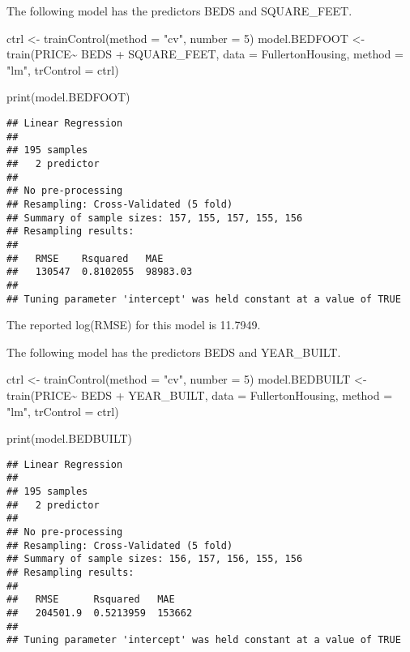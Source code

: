 \documentclass[
]{article}
\newenvironment{Shaded}{\begin{snugshade}}{\end{snugshade}}
\newcommand{\AttributeTok}[1]{\textcolor[rgb]{0.77,0.63,0.00}{#1}}
\newcommand{\DecValTok}[1]{\textcolor[rgb]{0.00,0.00,0.81}{#1}}
\newcommand{\FunctionTok}[1]{\textcolor[rgb]{0.00,0.00,0.00}{#1}}
\newcommand{\NormalTok}[1]{#1}
\newcommand{\OtherTok}[1]{\textcolor[rgb]{0.56,0.35,0.01}{#1}}
\newcommand{\SpecialCharTok}[1]{\textcolor[rgb]{0.00,0.00,0.00}{#1}}
\newcommand{\StringTok}[1]{\textcolor[rgb]{0.31,0.60,0.02}{#1}}
\begin{document}
The following model has the predictors BEDS and SQUARE\_FEET.

\begin{Shaded}
\begin{Highlighting}[]
\NormalTok{ctrl }\OtherTok{\textless{}{-}} \FunctionTok{trainControl}\NormalTok{(}\AttributeTok{method =} \StringTok{"cv"}\NormalTok{, }\AttributeTok{number =} \DecValTok{5}\NormalTok{)}
\NormalTok{model.BEDFOOT }\OtherTok{\textless{}{-}} \FunctionTok{train}\NormalTok{(PRICE}\SpecialCharTok{\textasciitilde{}}\NormalTok{ BEDS }\SpecialCharTok{+}\NormalTok{ SQUARE\_FEET, }
               \AttributeTok{data =}\NormalTok{ FullertonHousing, }\AttributeTok{method =} \StringTok{"lm"}\NormalTok{, }\AttributeTok{trControl =}\NormalTok{ ctrl)}

\FunctionTok{print}\NormalTok{(model.BEDFOOT)}
\end{Highlighting}
\end{Shaded}

\begin{verbatim}
## Linear Regression 
## 
## 195 samples
##   2 predictor
## 
## No pre-processing
## Resampling: Cross-Validated (5 fold) 
## Summary of sample sizes: 157, 155, 157, 155, 156 
## Resampling results:
## 
##   RMSE    Rsquared   MAE     
##   130547  0.8102055  98983.03
## 
## Tuning parameter 'intercept' was held constant at a value of TRUE
\end{verbatim}

The reported log(RMSE) for this model is 11.7949.

The following model has the predictors BEDS and YEAR\_BUILT.

\begin{Shaded}
\begin{Highlighting}[]
\NormalTok{ctrl }\OtherTok{\textless{}{-}} \FunctionTok{trainControl}\NormalTok{(}\AttributeTok{method =} \StringTok{"cv"}\NormalTok{, }\AttributeTok{number =} \DecValTok{5}\NormalTok{)}
\NormalTok{model.BEDBUILT }\OtherTok{\textless{}{-}} \FunctionTok{train}\NormalTok{(PRICE}\SpecialCharTok{\textasciitilde{}}\NormalTok{ BEDS }\SpecialCharTok{+}\NormalTok{ YEAR\_BUILT, }
               \AttributeTok{data =}\NormalTok{ FullertonHousing, }\AttributeTok{method =} \StringTok{"lm"}\NormalTok{, }\AttributeTok{trControl =}\NormalTok{ ctrl)}

\FunctionTok{print}\NormalTok{(model.BEDBUILT)}
\end{Highlighting}
\end{Shaded}

\begin{verbatim}
## Linear Regression 
## 
## 195 samples
##   2 predictor
## 
## No pre-processing
## Resampling: Cross-Validated (5 fold) 
## Summary of sample sizes: 156, 157, 156, 155, 156 
## Resampling results:
## 
##   RMSE      Rsquared   MAE   
##   204501.9  0.5213959  153662
## 
## Tuning parameter 'intercept' was held constant at a value of TRUE
\end{verbatim}
\end{document}
